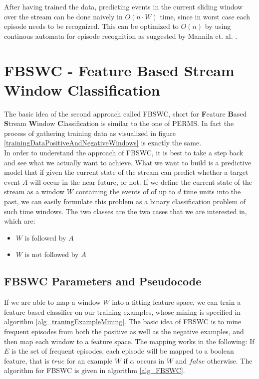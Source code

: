 After having trained the data, predicting events in the current sliding window over the stream can be done naively in $O(n \cdot W)$ time, since in worst case each episode needs to be recognized. This can be optimized to $O(n)$ by using continous automata for episode recognition as suggested by Mannila et. al. \cite{mannila1997discovery}.

\section{FBSWC - Feature Based Stream Window Classification}
\label{sec_FeatureBasedStreamWindowClassification}

The basic idea of the second approach called FBSWC, short for \textbf{F}eature \textbf{B}ased \textbf{S}tream \textbf{W}indow \textbf{C}lassification is similar to the one of PERMS. In fact the process of gathering training data as visualized in figure \ref{trainingDataPositiveAndNegativeWindows} is exactly the same. \\
In order to understand the approach of FBSWC, it is best to take a step back and see what we actually want to achieve. What we want to build is a predictive model that if given the current state of the stream can predict whether a target event $A$ will occur in the near future, or not. If we define the current state of the stream as a window $W$ containing the events of of up to $d$ time units into the past, we can easily formulate this problem as a binary classification problem of such time windows. The two classes are the two cases that we are interested in, which are:

\begin{itemize}
	\item $W$ is followed by $A$
	\item $W$ is not followed by $A$
\end{itemize}

\subsection{FBSWC Parameters and Pseudocode}

If we are able to map a window $W$ into a fitting feature space, we can train a feature based classifier on our training examples, whose mining is specified in algorithm \ref{alg_traningExampleMining}. The basic idea of FBSWC is to mine frequent episodes from both the positive as well as the negative examples, and then map each window to a feature space. The mapping works in the following: If $E$ is the set of frequent episodes, each episode will be mapped to a boolean feature, that is $true$ for an example $W$ if $\alpha$ occurs in $W$ and $false$ otherwise. The algorithm for FBSWC is given in algorithm \ref{alg_FBSWC}.

